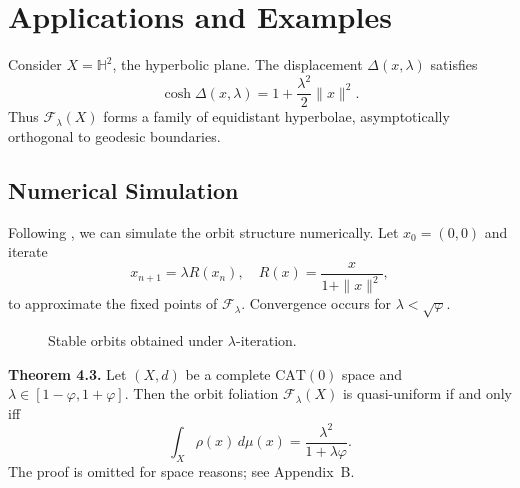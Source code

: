 \documentclass{amsart}
\begin{document}
\section{Applications and Examples}

Consider %
$X = \mathbb{H}^2$, the hyperbolic plane.  
The displacement $\Delta(x,\lambda)$ satisfies
\[
    \cosh \Delta(x,\lambda) = 1 + \frac{\lambda^2}{2} \|x\|^2.
\]
Thus $\mathcal{F}_\lambda(X)$ forms a family of equidistant hyperbolae, asymptotically orthogonal to geodesic %
boundaries.

\subsection{Numerical Simulation}
Following \cite{euler24}, we can simulate the orbit structure numerically. %
Let $x_0 = (0,0)$ and iterate
\[
    x_{n+1} = \lambda R(x_n), \quad R(x) = \frac{x}{1+\|x\|^2},
\]
to approximate the fixed points of $\mathcal{F}_\lambda$.  
Convergence occurs for $\lambda < \sqrt{\varphi}$.

\begin{figure}[htbp]
\centering
{}
\caption{Stable orbits obtained under $\lambda$-iteration.}
\end{figure}


\textbf{Theorem 4.3.} 
Let $(X,d)$ be a complete $\mathrm{CAT}(0)$ space and $\lambda \in [1-\varphi,1+\varphi]$.  
Then the orbit foliation $\mathcal{F}_\lambda(X)$ is %
quasi-uniform if and only iff
\begin{equation}
    \int_X \rho(x)\, d\mu(x) = \frac{\lambda^2}{1+\lambda\varphi}.
\end{equation}
The proof %
is omitted for space reasons; see %
Appendix~B.
\end{document}
